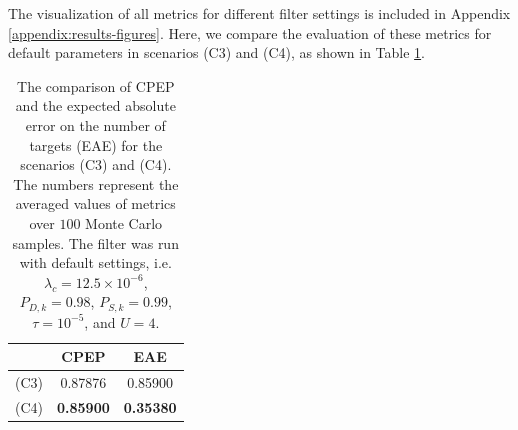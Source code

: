 The visualization of all metrics for different filter settings is included in Appendix \ref{appendix:results-figures}. Here, we compare the evaluation of these metrics for default parameters in scenarios (C3) and (C4), as shown in Table \ref{table:c3-c4-metrics}.

\begin{table}
\begin{center}
\begin{tabular}{ | c || c | c | }
    \hline
            & CPEP              & EAE               \\ [0.5ex]
    \hline\hline
    (C3)    & 0.87876           & 0.85900           \\ 
    (C4)    & \textbf{0.85900}  & \textbf{0.35380}  \\ [1ex]
    \hline
\end{tabular}
\end{center}
\caption[Comparison of simulation results for the (C3) and (C4) scenarios.]{The comparison of CPEP and the expected absolute error on the number of targets (EAE) for the scenarios (C3) and (C4). The numbers represent the averaged values of metrics over $100$ Monte Carlo samples. The filter was run with default settings, i.e. $\lambda_{c} = 12.5 \times 10^{-6}$, $P_{D,k} = 0.98$, $P_{S,k} = 0.99$, $\tau = 10^{-5}$, and $U=4$.}\label{table:c3-c4-metrics}
\end{table}
